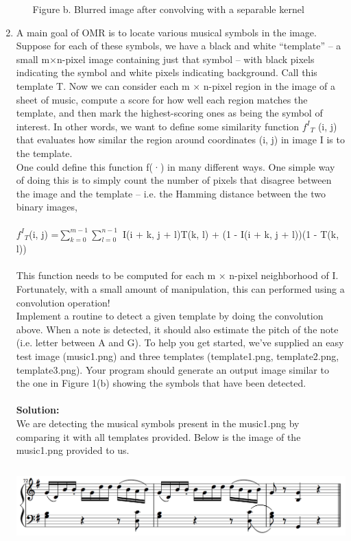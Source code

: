 \documentclass{article}
\begin{document}
\begin{enumerate}
\begin{enumerate}
\begin{center}
			Figure b. Blurred image after convolving with a separable kernel \\
		\end{center}   
		\end{enumerate}
		\item A main goal of OMR is to locate various musical symbols in the image. Suppose for each of these
		symbols, we have a black and white “template” – a small m×n-pixel image containing just that symbol
		– with black pixels indicating the symbol and white pixels indicating background. Call this template
		T. Now we can consider each m × n-pixel region in the image of a sheet of music, compute a score
		for how well each region matches the template, and then mark the highest-scoring ones as being the symbol of interest. In other words, we want to define some similarity function ${f^I}_T$
		(i, j) that evaluates how similar the region around coordinates (i, j) in image I is to the template. \\ One could define this function f(·) in many different ways. One simple way of doing this is to simply count the number of pixels that disagree between the image and the template – i.e. the Hamming distance between the two binary images, \\ \\
		${f^I}_T$(i, j) =$\sum\limits_{k=0}^{m-1} \sum\limits_{l=0}^{n-1}$ I(i + k, j + l)T(k, l) + (1 - I(i + k, j + l))(1 - T(k, l)) \\ \\ This function needs to be computed for each m × n-pixel neighborhood of I. Fortunately, with a small amount of manipulation, this can performed using a convolution operation!\\
		Implement a routine to detect a given template by doing the convolution above. When a note is
		detected, it should also estimate the pitch of the note (i.e. letter between A and G). To help you get started, we’ve supplied an easy test image (music1.png) and three templates (template1.png, template2.png,
		template3.png). Your program should generate an output image similar to the one in
		Figure 1(b) showing the symbols that have been detected.\\ \\
		\textbf{Solution:} \\
		We are detecting the musical symbols present in the music1.png by comparing it with all templates provided. 
		Below is the image of the music1.png provided to us. 
		\begin{center}
			\includegraphics[height=3cm,width=14cm ]{music1.png}	\\	

\end{center}
\end{enumerate}
\end{document}
